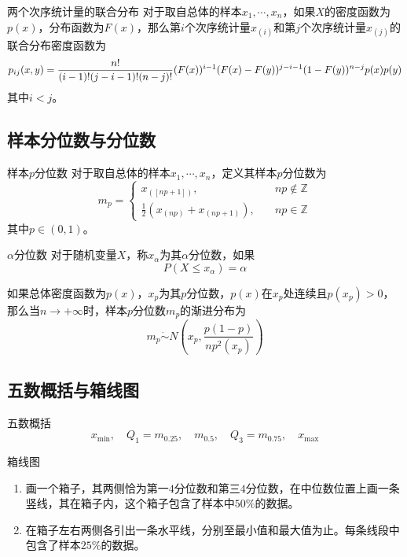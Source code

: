 \documentclass[lang = cn, scheme = chinese, thmcnt = section]{elegantbook}
\newcommand{\Z}{\mathbb{Z}}            %
\begin{document}
\begin{theorem}{两个次序统计量的联合分布}
	对于取自总体的样本$x_1,\cdots,x_n$，如果$X$的密度函数为$p(x)$，分布函数为$F(x)$，那么第$i$个次序统计量$x_{(i)}$和第$j$个次序统计量$x_{(j)}$的联合分布密度函数为
	$$
	\small{p_{ij}(x,y)=\frac{n!}{(i-1)!(j-i-1)!(n-j)!}(F(x))^{i-1}(F(x)-F(y))^{j-i-1}(1-F(y))^{n-j}p(x)p(y)}
	$$
	其中$i<j$。
\end{theorem}

\subsection{样本分位数与分位数}

\begin{definition}{样本$p$分位数}
	对于取自总体的样本$x_1,\cdots,x_n$，定义其样本$p$分位数为
	$$
	m_p=\begin{cases}
		x_{([np+1])},\quad & np\notin\Z\\
		\frac{1}{2}\left(x_{(np)}+x_{(np+1)}\right),\quad & np\in\Z
	\end{cases}
	$$
	其中$p\in(0,1)$。
\end{definition}

\begin{definition}{$\alpha$分位数}
	对于随机变量$X$，称$x_\alpha$为其$\alpha$分位数，如果
	$$
	P(X\le x_\alpha)=\alpha
	$$
\end{definition}

\begin{theorem}
	如果总体密度函数为$p(x)$，$x_p$为其$p$分位数，$p(x)$在$x_p$处连续且$p(x_p)>0$，那么当$n\to+\infty$时，样本$p$分位数$m_p$的渐进分布为
	$$
	m_p\dot{\sim}N\left( x_p,\frac{p(1-p)}{np^2(x_p)} \right)
	$$
\end{theorem}

\subsection{五数概括与箱线图}

\begin{definition}{五数概括}
	$$
	x_{\min},\quad Q_1=m_{0.25},\quad m_{0.5},\quad Q_3=m_{0.75},\quad x_{\max}
	$$
\end{definition}

\begin{definition}{箱线图}
	\begin{enumerate}
		\item 画一个箱子，其两侧恰为第一$4$分位数和第三$4$分位数，在中位数位置上画一条竖线，其在箱子内，这个箱子包含了样本中$50\%$的数据。
		\item 在箱子左右两侧各引出一条水平线，分别至最小值和最大值为止。每条线段中包含了样本$25\%$的数据。
	\end{enumerate}
\end{definition}
\end{document}
